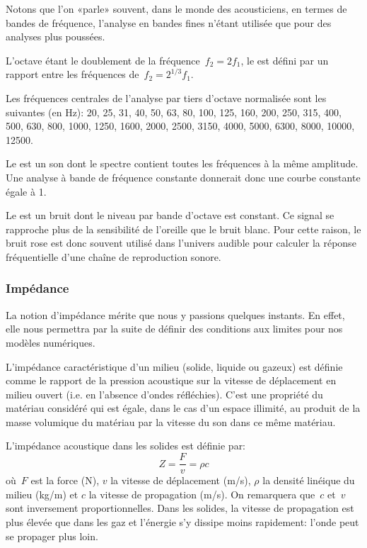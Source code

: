 \medskip
Notons que l'on «parle» souvent, dans le monde des acousticiens, en termes de bandes de fréquence, l'analyse en bandes fines n'étant utilisée que pour des analyses plus poussées.

L'octave étant le doublement de la fréquence~$f_2=2f_1$, le  est défini par un rapport entre les fréquences de~$f_2=2^{1/3}f_1$. 
   
Les fréquences centrales de l'analyse par tiers d'octave normalisée sont les suivantes
(en Hz): 20, 25, 31, 40, 50, 63, 80, 100, 125, 160, 200, 250, 315, 400, 500, 630, 800, 1000, 1250, 1600, 2000, 2500, 3150, 4000, 5000, 6300, 8000, 10000, 12500.

\medskip   
Le   est un son dont le spectre contient toutes les fréquences à la même amplitude. Une analyse à bande de fréquence constante donnerait donc une courbe constante égale à 1.
   
Le  est un bruit dont le niveau par bande d'octave est constant. Ce signal se rapproche plus de la sensibilité de l'oreille que le bruit blanc. Pour cette raison, le bruit rose est donc souvent utilisé dans l'univers audible pour calculer
la réponse fréquentielle d'une chaîne de reproduction sonore.

\medskip
\subsubsection{Impédance}\label{Sec-Imp}

La notion d'impédance mérite que nous y passions quelques instants. En effet, elle nous permettra par la suite de définir des conditions aux limites pour nos modèles numériques.

L'impédance caractéristique d'un milieu (solide, liquide ou gazeux) est définie comme le rapport de la pression acoustique sur la vitesse de déplacement en milieu ouvert (i.e. en l'absence d'ondes réfléchies). C'est une propriété du matériau considéré qui est égale, dans le cas d'un espace illimité, au produit de la masse volumique du matériau par la vitesse du son dans ce même matériau.

\medskip
L'impédance acoustique dans les solides est définie par:
\begin{equation}
Z = \dfrac{F}{v}=\rho c
\end{equation}
où~$F$ est la force (N), $v$ la vitesse de déplacement (m/s), $\rho$ la densité linéique du milieu (kg/m) et $c$ la vitesse de propagation (m/s).
On remarquera que~$c$ et~$v$ sont inversement proportionnelles.
Dans les solides, la vitesse de propagation est plus élevée que dans les gaz et l'énergie s'y dissipe moins rapidement: l'onde peut se propager plus loin.

